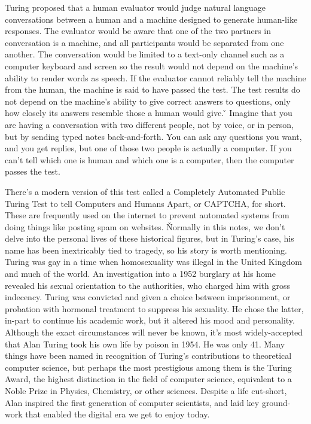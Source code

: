 Turing proposed that a human evaluator would judge natural language conversations between a human and a machine
designed to generate human-like responses. The evaluator would be aware that one of the two partners in conversation
is a machine, and all participants would be separated from one another. The conversation would be limited to a
text-only channel such as a computer keyboard and screen so the result would not depend on the machine's ability to
render words as speech. If the evaluator cannot reliably tell the machine from the human, the machine is said to have
passed the test. The test results do not depend on the machine's ability to give correct answers to questions, only
how closely its answers resemble those a human would give. \v

\be
Imagine that you are having a conversation with two different people, not by voice, or in person, but by sending
typed notes back-and-forth. You can ask any questions you want, and you get replies, but one of those two people is
actually a computer. If you can't tell which one is human and which one is a computer, then the computer passes the
test.
\ee

There's a modern version of this test called a Completely Automated Public Turing Test to tell Computers and Humans
Apart, or CAPTCHA, for short. These are frequently used on the internet to prevent automated systems from doing
things like posting spam on websites. \v

Normally in this notes, we don't delve into the personal lives of these historical figures, but in Turing's case, his
name has been inextricably tied to tragedy, so his story is worth mentioning. Turing was gay in a time when
homosexuality was illegal in the United Kingdom and much of the world. An investigation into a 1952 burglary at his
home revealed his sexual orientation to the authorities, who charged him with gross indecency. Turing was convicted
and given a choice between imprisonment, or probation with hormonal treatment to suppress his sexuality. He chose the
latter, in-part to continue his academic work, but it altered his mood and personality. Although the exact
circumstances will never be known, it's most widely-accepted that Alan Turing took his own life by poison in 1954. He
was only 41. \v

Many things have been named in recognition of Turing's contributions to theoretical computer science, but perhaps the
most prestigious among them is the Turing Award, the highest distinction in the field of computer science, equivalent
to a Noble Prize in Physics, Chemistry, or other sciences. Despite a life cut-short, Alan inspired the first
generation of computer scientists, and laid key ground-work that enabled the digital era we get to enjoy today.

